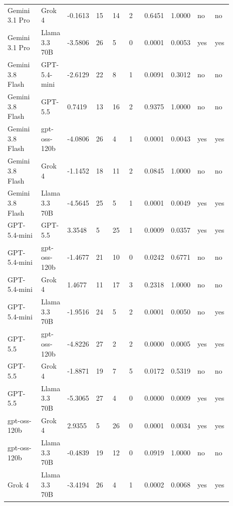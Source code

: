 \begin{landscape}
\begin{longtable}{p{0.162\linewidth}p{0.081\linewidth}p{0.081\linewidth}p{0.081\linewidth}p{0.081\linewidth}p{0.081\linewidth}p{0.081\linewidth}p{0.081\linewidth}p{0.081\linewidth}p{0.081\linewidth}}
Gemini 3.1 Pro & Grok 4 & -0.1613 & 15 & 14 & 2 & 0.6451 & 1.0000 & no & no \\
Gemini 3.1 Pro & Llama 3.3 70B & -3.5806 & 26 & 5 & 0 & 0.0001 & 0.0053 & yes & yes \\
Gemini 3.8 Flash & GPT-5.4-mini & -2.6129 & 22 & 8 & 1 & 0.0091 & 0.3012 & no & no \\
Gemini 3.8 Flash & GPT-5.5 & 0.7419 & 13 & 16 & 2 & 0.9375 & 1.0000 & no & no \\
Gemini 3.8 Flash & gpt-oss-120b & -4.0806 & 26 & 4 & 1 & 0.0001 & 0.0043 & yes & yes \\
Gemini 3.8 Flash & Grok 4 & -1.1452 & 18 & 11 & 2 & 0.0845 & 1.0000 & no & no \\
Gemini 3.8 Flash & Llama 3.3 70B & -4.5645 & 25 & 5 & 1 & 0.0001 & 0.0049 & yes & yes \\
GPT-5.4-mini & GPT-5.5 & 3.3548 & 5 & 25 & 1 & 0.0009 & 0.0357 & yes & yes \\
GPT-5.4-mini & gpt-oss-120b & -1.4677 & 21 & 10 & 0 & 0.0242 & 0.6771 & no & no \\
GPT-5.4-mini & Grok 4 & 1.4677 & 11 & 17 & 3 & 0.2318 & 1.0000 & no & no \\
GPT-5.4-mini & Llama 3.3 70B & -1.9516 & 24 & 5 & 2 & 0.0001 & 0.0050 & no & yes \\
GPT-5.5 & gpt-oss-120b & -4.8226 & 27 & 2 & 2 & 0.0000 & 0.0005 & yes & yes \\
GPT-5.5 & Grok 4 & -1.8871 & 19 & 7 & 5 & 0.0172 & 0.5319 & no & no \\
GPT-5.5 & Llama 3.3 70B & -5.3065 & 27 & 4 & 0 & 0.0000 & 0.0009 & yes & yes \\
gpt-oss-120b & Grok 4 & 2.9355 & 5 & 26 & 0 & 0.0001 & 0.0034 & yes & yes \\
gpt-oss-120b & Llama 3.3 70B & -0.4839 & 19 & 12 & 0 & 0.0919 & 1.0000 & no & no \\
Grok 4 & Llama 3.3 70B & -3.4194 & 26 & 4 & 1 & 0.0002 & 0.0068 & yes & yes \\
\bottomrule
\end{longtable}
\normalsize
\end{landscape}
